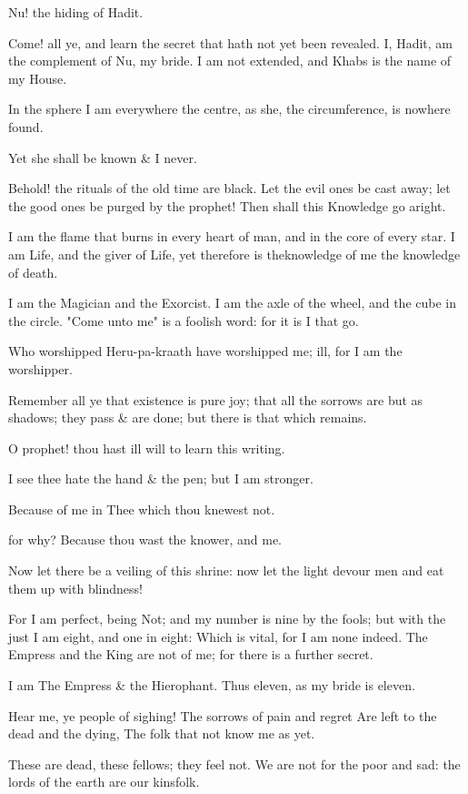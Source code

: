 Nu! the hiding of Hadit.

Come! all ye, and learn the secret that hath not yet been revealed. I, Hadit, am the complement of Nu, my bride. I am not extended, and Khabs is the name of my House.

In the sphere I am everywhere the centre, as she, the circumference, is nowhere found.

Yet she shall be known \& I never.

Behold! the rituals of the old time are black. Let the evil ones be cast away; let the good ones be purged by the prophet! Then shall this Knowledge go aright.

I am the flame that burns in every heart of man, and in the core of every star. I am Life, and the giver of Life, yet therefore is theknowledge of me the knowledge of death.

I am the Magician and the Exorcist. I am the axle of the wheel, and the cube in the circle. "Come unto me" is a foolish word: for it is I that go.

Who worshipped Heru-pa-kraath have worshipped me; ill, for I am the worshipper.

Remember all ye that existence is pure joy; that all the sorrows are but as shadows; they pass \& are done; but there is that which remains.

O prophet! thou hast ill will to learn this writing.

I see thee hate the hand \& the pen; but I am stronger.

Because of me in Thee which thou knewest not.

for why? Because thou wast the knower, and me.

Now let there be a veiling of this shrine: now let the light devour men and eat them up with blindness!

For I am perfect, being Not; and my number is nine by the fools; but with the just I am eight, and one in eight: Which is vital, for I am none indeed. The Empress and the King are not of me; for there is a further secret.

I am The Empress \& the Hierophant. Thus eleven, as my bride is eleven.

Hear me, ye people of sighing!
The sorrows of pain and regret
Are left to the dead and the dying,
The folk that not know me as yet.

These are dead, these fellows; they feel not. We are not for the poor and sad: the lords of the earth are our kinsfolk.

